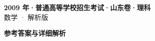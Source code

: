 \documentclass[zihao=-4, a4paper]{ctexart}
\begin{document}
\begin{center}
  {\Large\bfseries 2009 年·普通高等学校招生考试·山东卷·理科}\\[4pt]
  {\large 数学 · 解析版}
\end{center}
\medskip
{}

\clearpage
{}
\begin{center}{\Large\bfseries 参考答案与详细解析}\end{center}
\medskip

\end{document}

